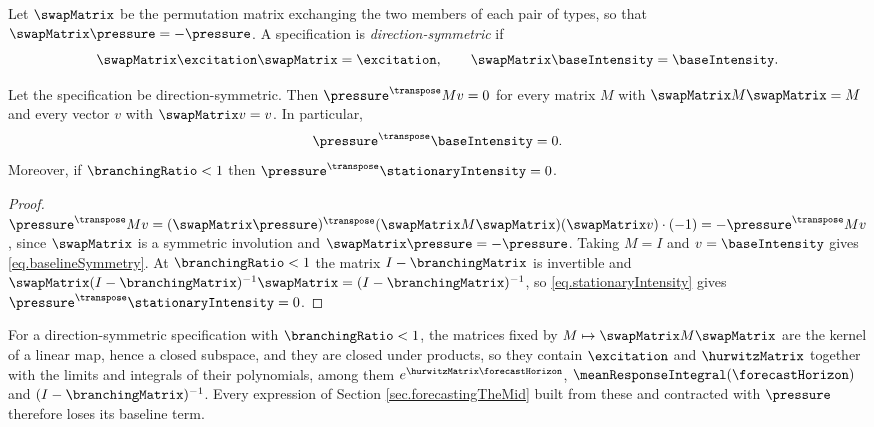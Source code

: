 \begin{defi}\label{def.directionSymmetry}
 Let $\swapMatrix$ be the permutation matrix exchanging the two members of each pair of
 types, so that $\swapMatrix\pressure = -\pressure$.
 A specification is \emph{direction-symmetric} if
 \begin{equation}\label{eq.directionSymmetry}
  \swapMatrix \excitation \swapMatrix = \excitation ,
  \qquad
  \swapMatrix \baseIntensity = \baseIntensity .
 \end{equation}
\end{defi}

\begin{prop}\label{prop.directionSymmetry}
 Let the specification be direction-symmetric.
 Then $\pressure^{\transpose} M v = 0$
 for every matrix $M$ with $\swapMatrix M \swapMatrix = M$
 and every vector $v$ with $\swapMatrix v = v$.
 In particular,
 \begin{equation}\label{eq.baselineSymmetry}
  \pressure^{\transpose}\baseIntensity = 0.
 \end{equation}
 Moreover, if $\branchingRatio < 1$ then
 $\pressure^{\transpose}\stationaryIntensity = 0$.
\end{prop}
\begin{proof}
 $\pressure^{\transpose} M v
 = (\swapMatrix\pressure)^{\transpose}(\swapMatrix M \swapMatrix)(\swapMatrix v)
 \cdot (-1)
 = -\pressure^{\transpose} M v$,
 since $\swapMatrix$ is a symmetric involution and $\swapMatrix\pressure = -\pressure$.
 Taking $M = I$ and $v = \baseIntensity$ gives \eqref{eq.baselineSymmetry}.
 At $\branchingRatio < 1$ the matrix $I - \branchingMatrix$ is invertible and
 $\swapMatrix(I-\branchingMatrix)^{-1}\swapMatrix = (I-\branchingMatrix)^{-1}$,
 so \eqref{eq.stationaryIntensity} gives
 $\pressure^{\transpose}\stationaryIntensity = 0$.
\end{proof}

For a direction-symmetric specification with $\branchingRatio < 1$,
the matrices fixed by $M \mapsto \swapMatrix M \swapMatrix$ are the kernel of a linear map,
hence a closed subspace, and they are closed under products,
so they contain $\excitation$ and $\hurwitzMatrix$ together with the limits and integrals
of their polynomials, among them $e^{\hurwitzMatrix \forecastHorizon}$,
$\meanResponseIntegral(\forecastHorizon)$ and $(I - \branchingMatrix)^{-1}$.
Every expression of Section \ref{sec.forecastingTheMid} built from these and contracted with
$\pressure$ therefore loses its baseline term.

